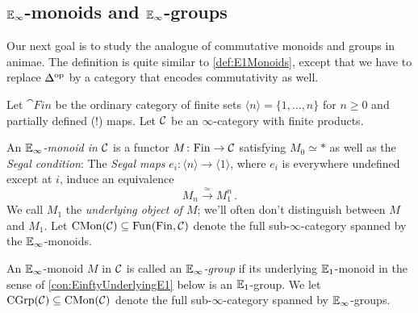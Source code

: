\subsection{\texorpdfstring{$\mathbb{E}_\infty$}{E-inftinity}-monoids and \texorpdfstring{$\mathbb{E}_\infty$}{E-infinity}-groups}\label{subsec:Einfty}
Our next goal is to study the analogue of commutative monoids and groups in animae. The definition is quite similar to \cref{def:E1Monoids}, except that we have to replace $\IDelta^\op$ by a category that encodes commutativity as well.
\begin{defi}\label{def:EinftyMonoid}
	Let $\cat{Fin}$ be the ordinary category of finite sets $\langle n\rangle =\{1,\dotsc,n\}$ for $n\geqslant 0$ and partially defined (!) maps. Let $\mathcal{C}$ be an $\infty$-category with finite products.
	\begin{alphanumerate}
		\item An \emph{$\mathbb{E}_\infty$-monoid in $\mathcal{C}$} is a functor $M\colon \mathrm{Fin}\rightarrow \mathcal{C}$ satisfying $M_0\simeq *$ as well as the \emph{Segal condition}: The \emph{Segal maps} $e_i\colon \langle n\rangle\rightarrow \langle 1\rangle$, where $e_i$ is everywhere undefined except at $i$, induce an equivalence\label{enum:EinftyMonoid}
		\begin{equation*}
			M_n\overset{\simeq}{\longrightarrow}M_1^n\,.
		\end{equation*}
		We call $M_1$ the \emph{underlying object of $M$}; we'll often don't distinguish between $M$ and $M_1$. Let $\mathrm{CMon}(\mathcal{C})\subseteq\operatorname{Fun}(\mathrm{Fin},\mathcal{C})$ denote the full sub-$\infty$-category spanned by the $\mathbb{E}_\infty$-monoids.
		\item An $\mathbb{E}_\infty$-monoid $M$ in $\mathcal{C}$ is called an \emph{$\mathbb{E}_\infty$-group} if its underlying $\mathbb{E}_1$-monoid in the sense of \cref{con:EinftyUnderlyingE1} below is an $\mathbb{E}_1$-group. We let $\mathrm{CGrp}(\mathcal{C})\subseteq \mathrm{CMon}(\mathcal{C})$ denote the full sub-$\infty$-category spanned by $\mathbb{E}_\infty$-groups. \label{enum:EinftyGroup}
	\end{alphanumerate}
\end{defi}
